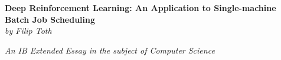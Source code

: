 \documentclass{article}
\begin{document}
\begin{titlepage}
    \vspace*{\fill}
    \vspace*{-4cm}
    \begin{center}
        \huge \textbf { Deep Reinforcement Learning: An Application to Single-machine Batch Job Scheduling } \\
        \vspace{0.5cm}
        \Large \textit { by Filip Toth }
    \end{center}
    \vspace*{\fill}
    \begin{center}
        \large \textit {An IB Extended Essay in the subject of Computer Science}
    \end{center}
\end{titlepage}

\tableofcontents
\newpage
\end{document}
